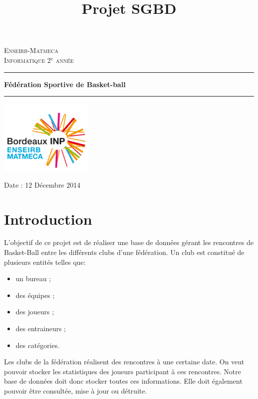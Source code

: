 \documentclass[a4paper,12pt]{article}
\title{Projet SGBD}
\begin{document}
\begin{titlepage}
\thispagestyle{empty}
\begin{sffamily}
  \begin{center}
  \textsc{\LARGE Enseirb-Matmeca}\\[2cm]
  \textsc{\LARGE Informatique 2$^e$ année}\\[2cm]
  \end{center}
  \end{sffamily}

\noindent \rule{\textwidth}{0.5pt}
  \begin{center}
  \Huge
  \textbf{Fédération Sportive de Basket-ball}
  \end{center}
\noindent \rule{\textwidth}{0.5pt}

\begin{center}
\includegraphics[scale=1.1]{logo.png}
\end{center}
\vspace{2cm}

\begin{center}
Date : 12 Décembre 2014
\end{center}

\end{titlepage}

\tableofcontents
\clearpage

\section*{Introduction}
L'objectif de ce projet est de réaliser une base de données gérant les rencontres de Basket-Ball entre les différents clubs d'une fédération. Un club est constitué de plusieurs entités telles que:
\begin{itemize}
\item un bureau ;
\item des équipes ;
\item des joueurs ;
\item des entraineurs ;
\item des catégories.
\end{itemize}
\vspace{0.25cm}
Les clubs de la fédération réalisent des rencontres à une certaine date. On veut pouvoir stocker les statistiques des joueurs participant à ces rencontres. Notre base de données doit donc stocker toutes ces informations. Elle doit également pouvoir être consultée, mise à jour ou détruite.
\end{document}
